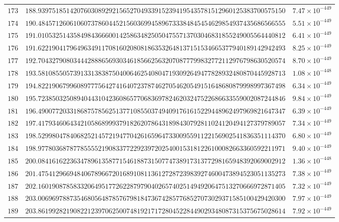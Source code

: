 \documentclass[12pt,reqno]{amsart}
\theoremstyle{remark}
\begin{document}
\begin{longtable}{clc}
$173$ & $188.9397518514207603089292156527049339152394195435781512960125383700575150$ & $7.47\times 10^{-449}$ \\
$174$ & $190.4845712606106073786044521560369945896733384845454629854937435686566555$ & $5.51\times 10^{-449}$ \\
$175$ & $191.0105325143584984366600142586348250504755713703046831855249005564440812$ & $6.41\times 10^{-449}$ \\
$176$ & $191.6221904179649634911708160208081863532648137151534665377940189142942493$ & $8.25\times 10^{-449}$ \\
$177$ & $192.7043279080344428886569303461856625632070877799832772112976798630520574$ & $8.70\times 10^{-449}$ \\
$178$ & $193.5810855057391331383875040064625408047193092649477828932480870445928713$ & $1.08\times 10^{-448}$ \\
$179$ & $194.8221906799608977756427416407237874627054620549151648680879998997367498$ & $6.34\times 10^{-449}$ \\
$180$ & $195.7238503250894044310423608657706836978246203247522686633559002087244846$ & $9.84\times 10^{-449}$ \\
$181$ & $196.4900772033186875785625137710855037494091761615229448962497969821647347$ & $6.39\times 10^{-449}$ \\
$182$ & $197.4179346064342105868999379182620786431898430792811024120494127379789057$ & $7.34\times 10^{-449}$ \\
$183$ & $198.5299804784068252145721947704261659647330095591122156902541836351114370$ & $6.80\times 10^{-449}$ \\
$184$ & $198.9778036878778555521908337722923972025400153181226100082663360592211971$ & $9.40\times 10^{-449}$ \\
$185$ & $200.0841616223634789613587715461887315077473891731377298165948392069002912$ & $1.36\times 10^{-448}$ \\
$186$ & $201.4754129669484067896672016891081136127287239839274600473894523051135273$ & $7.38\times 10^{-449}$ \\
$187$ & $202.1601908785833206495177262287979040265740251494920647513270666972871405$ & $7.32\times 10^{-449}$ \\
$188$ & $203.0069697887354680564878576798184736742857768527073029371585100429420300$ & $7.97\times 10^{-449}$ \\
$189$ & $203.8619928219082212397062500748192171728045228449029348087315375675028614$ & $7.92\times 10^{-449}$ \\

\end{longtable}
\end{document}
